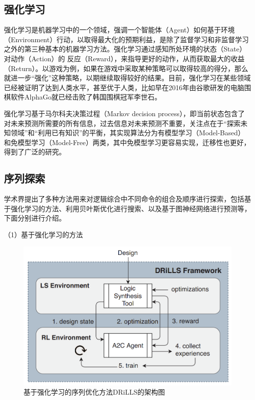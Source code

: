\subsection{强化学习}

强化学习是机器学习中的一个领域，强调一个智能体（Agent）如何基于环境（Environment）行动，以取得最大化的预期利益，是除了监督学习和非监督学习之外的第三种基本的机器学习方法。强化学习通过感知所处环境的状态（State）对动作（Action）的 反应（Reward），来指导更好的动作，从而获取最大的收益（Return）。以游戏为例，如果在游戏中采取某种策略可以取得较高的得分，那么就进一步“强化”这种策略，以期继续取得较好的结果。目前，强化学习在某些领域已经被证明了达到人类水平，甚至优于人类，比如早在2016年由谷歌研发的电脑围棋软件AlphaGo\cite{AI:AlphaGo}就已经击败了韩国围棋冠军李世石。

强化学习基于马尔科夫决策过程（Markov decision process），即当前状态包含了对未来预测所需要的所有信息，过去信息对未来预测不重要，关注点在于“探索未知领域”和“利用已有知识”的平衡，其实现算法分为有模型学习（Model-Based）和免模型学习（Model-Free）两类，其中免模型学习更容易实现，迁移性也更好，得到了广泛的研究。

\subsection{序列探索}

学术界提出了多种方法用来对逻辑综合中不同命令的组合及顺序进行探索，包括基于强化学习的方法、利用贝叶斯优化进行搜索、以及基于图神经网络进行预测等，下面分别进行介绍。

（1）基于强化学习的方法

\begin{figure}[!htbp]
    \centering
    \includegraphics[width=0.7\linewidth]{./figs/LS-DRiLLS-framework.png}
    \caption{基于强化学习的序列优化方法DRiLLS的架构图}
    \label{LS:DRiLLS:Fig:framework}
\end{figure}

